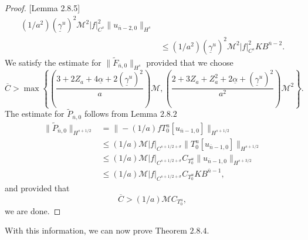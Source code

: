 \begin{proof}{[Lemma 2.8.5]}
\begin{align*}
(1/a^2)(\underline{\gamma}^u)^2\mathcal{M}^2|f|_{C^{s}}^2\|u_{\overline{n}-2, 0}\|_{H^{s}}\\&\le
(1/a^2)(\underline{\gamma}^u)^2\mathcal{M}^2|f|_{C^{s}}^2KB^{\overline{n}-2}.
\end{align*}
We satisfy the estimate for $\|\tilde{F}_{\overline{n},0}\|_{H^{s}}$ provided that we choose
$$\overline{C} > \max\left\{\left(\frac{3+2Z_a+4\underline{\alpha}+2(\underline{\gamma}^u)^2}{a}\right)\mathcal{M},\left(\frac{2+3Z_a+{Z^2_a}+2\underline{\alpha}+(\underline{\gamma}^u)^2}{a^2} \right)\mathcal{M}^2    \right\}.$$
The estimate for $\tilde{P}_{\overline{n},0}$ follows from Lemma $2.8.2$
\begin{align*}
\|\tilde{P}_{\overline{n},0}\|_{H^{s+1/2}}&=\|-(1/a)fT_0^u\left[u_{\overline{n}-1,0}\right]\|_{H^{s+1/2}}\\&\le
(1/a)\mathcal{M}|f|_{C^{s+1/2+\sigma}}\|T_0^u\left[u_{\overline{n}-1,0}\right]\|_{H^{s+1/2}}\\&\le
(1/a)\mathcal{M}|f|_{C^{s+1/2+\sigma}}C_{T_0^u}\|u_{\overline{n}-1,0}\|_{H^{s+3/2}}\\&\le
(1/a)\mathcal{M}|f|_{C^{s+1/2+\sigma}}C_{T_0^u}KB^{\overline{n}-1},
\end{align*}
and provided that
$$\overline{C} > (1/a)\mathcal{M}C_{T_0^u},$$
we are done. 
\end{proof}
\begin{flushleft}
With this information, we can now prove Theorem $2.8.4.$
\end{flushleft}

